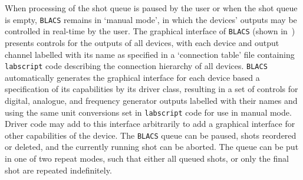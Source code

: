 When processing of the shot queue is paused by the user or when the shot queue is empty, \texttt{BLACS} remains in `manual mode', in which the devices' outputs may be controlled in real-time by the user. The graphical interface of \texttt{BLACS} (shown in~) presents controls for the outputs of all devices, with each device and output channel labelled with its name as specified in a `connection table' file containing \texttt{labscript} code describing the connection hierarchy of all devices. \texttt{BLACS} automatically generates the graphical interface for each device based a specification of its capabilities by its driver class, resulting in a set of controls for digital, analogue, and frequency generator outputs labelled with their names and using the same unit conversions set in \texttt{labscript} code for use in manual mode. Driver code may add to this interface arbitrarily to add a graphical interface for other capabilities of the device. The \texttt{BLACS} queue can be paused, shots reordered or deleted, and the currently running shot can be aborted. The queue can be put in one of two repeat modes, such that either all queued shots, or only the final shot are repeated indefinitely.

